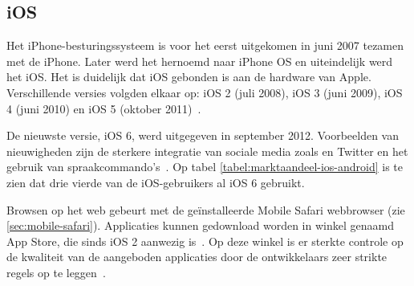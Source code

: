 \begin{table}[t]
\centering
{}
\quad
{}
\caption{Marktaandeel van iOS-versies op 8 mei 2013 en Android-versies op 1 mei 2013.  \protect\cite{Smith2013,Android2013}.}
\label{tabel:marktaandeel-ios-android}
\end{table}

\subsection{iOS}
Het iPhone-besturingssysteem is voor het eerst uitgekomen in juni 2007 tezamen met de iPhone. 
Later werd het hernoemd naar iPhone OS en uiteindelijk werd het iOS. 
Het is duidelijk dat iOS gebonden is aan de hardware van Apple. 
Verschillende versies volgden elkaar op: iOS 2 (juli 2008), iOS 3 (juni 2009), iOS 4 (juni 2010) en iOS 5 (oktober 2011)~\cite{Deitel2012, PhilDutson2012}. 

De nieuwste versie, iOS 6, werd uitgegeven in september 2012. 
Voorbeelden van nieuwigheden zijn de sterkere integratie van sociale media zoals \fb{} en Twitter en het gebruik van spraakcommando's~\cite{Deitel2012}. 
Op tabel \ref{tabel:marktaandeel-ios-android} is te zien dat drie vierde van de iOS-gebruikers al iOS 6 gebruikt.

Browsen op het web gebeurt met de geïnstalleerde Mobile Safari webbrowser (zie \ref{sec:mobile-safari}). Applicaties kunnen gedownload worden in winkel genaamd App Store, die sinds iOS 2 aanwezig is~\cite{Deitel2012}. 
Op deze winkel is er sterkte controle op de kwaliteit van de aangeboden applicaties door de ontwikkelaars zeer strikte regels op te leggen~\cite{Apple2010a}.

